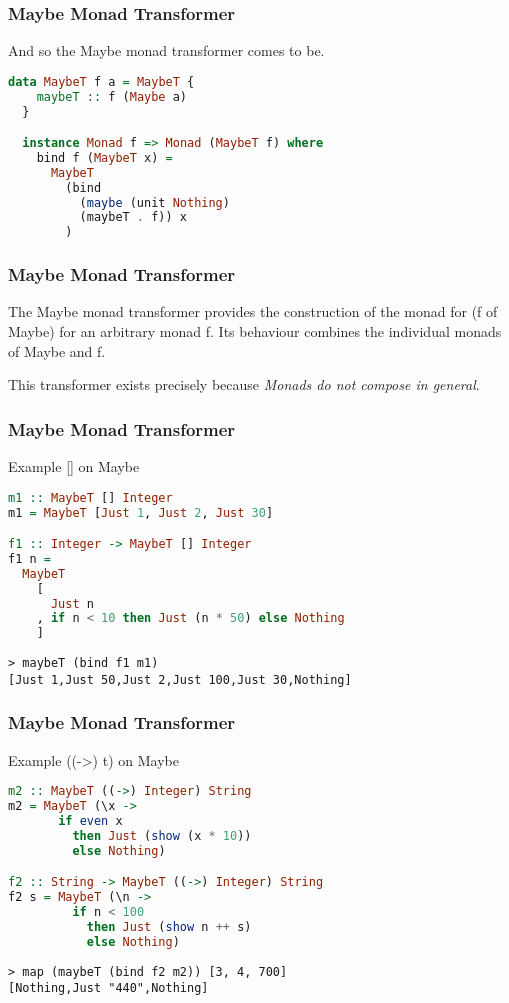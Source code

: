 \begin{frame}[fragile]
\frametitle{Maybe Monad Transformer}
And so the Maybe monad transformer comes to be.

\begin{lstlisting}[language=haskell]
  data MaybeT f a = MaybeT { 
    maybeT :: f (Maybe a)
  }

  instance Monad f => Monad (MaybeT f) where
    bind f (MaybeT x) =
      MaybeT 
        (bind 
          (maybe (unit Nothing) 
          (maybeT . f)) x
        )
\end{lstlisting}
\end{frame}

\begin{frame}[fragile]
\frametitle{Maybe Monad Transformer}
\begin{block}{The Maybe monad transformer}
provides the construction of the monad for (f of Maybe) for an arbitrary monad f. Its behaviour combines the individual monads of Maybe and f.
\end{block}
\begin{block}{This transformer exists}
precisely because \emph{Monads do not compose in general}.
\end{block}
\end{frame}

\begin{frame}[fragile]
\frametitle{Maybe Monad Transformer}
\begin{block}{Example [] on Maybe}
\begin{lstlisting}[language=haskell]
m1 :: MaybeT [] Integer
m1 = MaybeT [Just 1, Just 2, Just 30]

f1 :: Integer -> MaybeT [] Integer
f1 n =
  MaybeT
    [
      Just n
    , if n < 10 then Just (n * 50) else Nothing
    ]
\end{lstlisting}
\end{block}
\begin{lstlisting}
> maybeT (bind f1 m1)
[Just 1,Just 50,Just 2,Just 100,Just 30,Nothing]
\end{lstlisting}
\end{frame}

\begin{frame}[fragile]
\frametitle{Maybe Monad Transformer}
\begin{block}{Example ((->) t) on Maybe}
\begin{lstlisting}[language=haskell]
m2 :: MaybeT ((->) Integer) String
m2 = MaybeT (\x ->
       if even x
         then Just (show (x * 10))
         else Nothing)

f2 :: String -> MaybeT ((->) Integer) String
f2 s = MaybeT (\n -> 
         if n < 100
           then Just (show n ++ s)
           else Nothing)
\end{lstlisting}
\end{block}
\begin{lstlisting}
> map (maybeT (bind f2 m2)) [3, 4, 700]
[Nothing,Just "440",Nothing]
\end{lstlisting}
\end{frame}

